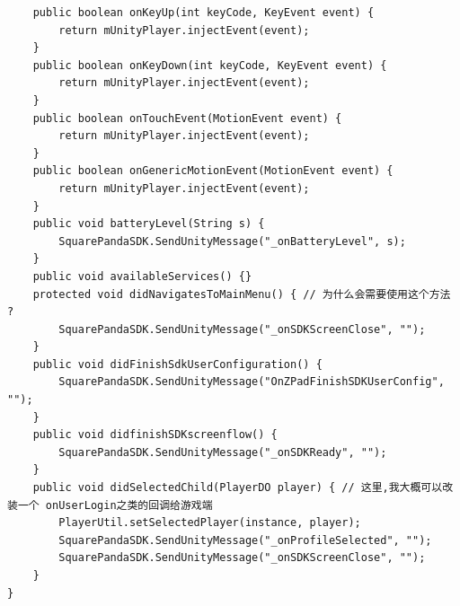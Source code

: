 \documentclass[9pt, b5paper]{article}
\begin{document}
\begin{verbatim}
    public boolean onKeyUp(int keyCode, KeyEvent event) {
        return mUnityPlayer.injectEvent(event);
    }
    public boolean onKeyDown(int keyCode, KeyEvent event) {
        return mUnityPlayer.injectEvent(event);
    }
    public boolean onTouchEvent(MotionEvent event) {
        return mUnityPlayer.injectEvent(event);
    }
    public boolean onGenericMotionEvent(MotionEvent event) {
        return mUnityPlayer.injectEvent(event);
    }
    public void batteryLevel(String s) {
        SquarePandaSDK.SendUnityMessage("_onBatteryLevel", s);
    }
    public void availableServices() {}
    protected void didNavigatesToMainMenu() { // 为什么会需要使用这个方法 ?
        SquarePandaSDK.SendUnityMessage("_onSDKScreenClose", "");
    }
    public void didFinishSdkUserConfiguration() {
        SquarePandaSDK.SendUnityMessage("OnZPadFinishSDKUserConfig", "");
    }
    public void didfinishSDKscreenflow() {
        SquarePandaSDK.SendUnityMessage("_onSDKReady", "");
    }
    public void didSelectedChild(PlayerDO player) { // 这里,我大概可以改装一个 onUserLogin之类的回调给游戏端
        PlayerUtil.setSelectedPlayer(instance, player);
        SquarePandaSDK.SendUnityMessage("_onProfileSelected", "");
        SquarePandaSDK.SendUnityMessage("_onSDKScreenClose", "");
    }
}
\end{verbatim}
\end{document}
